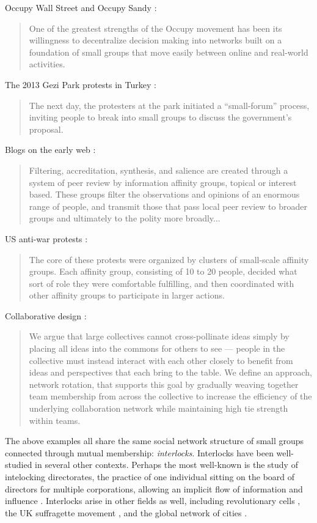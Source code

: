 \documentclass[manuscript,screen,review,acmsmall]{acmart}
\begin{document}
Occupy Wall Street and Occupy Sandy \cite{manilov_occupy_2013}:
\begin{quote}
One of the greatest strengths of the Occupy movement has been its willingness to decentralize decision making into networks built on a foundation of small groups that move easily between online and real-world activities.
\end{quote}

The 2013 Gezi Park protests in Turkey \cite{tufekci_twitter_2017}:
\begin{quote}
The next day, the protesters at the park initiated a ``small-forum'' process,
inviting people to break into small groups to discuss the government’s proposal. 
\end{quote}

Blogs on the early web \cite{benkler_wealth_2006}:
\begin{quote}
Filtering, accreditation, synthesis, and salience are created through a system
of peer review by information affinity groups, topical or interest based.
These groups filter the observations and opinions of an enormous range of people,
and transmit those that pass local peer review to broader groups and ultimately to the polity more broadly...
\end{quote}

US anti-war protests \cite{detar_intertwinkles:_2013}:
\begin{quote}
The core of these protests were
organized by clusters of small-scale affinity groups. Each affinity
group, consisting of 10 to 20 people, decided what sort of role they
were comfortable fulfilling, and then coordinated with other affinity
groups to participate in larger actions.
\end{quote}

Collaborative design \cite{salehi_hive:_2018}:
\begin{quote}
We argue that large
collectives cannot cross-pollinate ideas simply by placing all ideas into the commons for others to
see — people in the collective must instead interact with each other closely to benefit from ideas and
perspectives that each bring to the table.
We define an approach, network rotation, that supports
this goal by gradually weaving together team membership from across the collective to increase
the efficiency of the underlying collaboration network while maintaining high tie strength within
teams.
\end{quote}

The above examples all share the same social network structure of small groups connected through mutual membership: {\em interlocks}.
Interlocks have been well-studied in several other contexts.
Perhaps the most well-known is the study of intelocking directorates,
the practice of one individual sitting on the board of directors for
multiple corporations,
allowing an implicit flow of information and influence
\cite{sapinski_interlocking_2018}.
Interlocks arise in other fields as well,
including revolutionary cells
\cite{fishcer_paul_1994, healey_using_2013},
the UK suffragette movement \cite{crossley_covert_2012},
and the global network of cities \cite{taylor_world_2015}.
\end{document}
